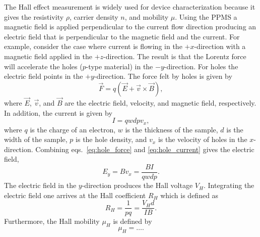 \noindent The Hall effect measurement is widely used for device characterization because it gives the resistivity $\rho$, carrier density $n$, and mobility $\mu$. Using the \acs{PPMS} a magnetic field is applied perpendicular to the current flow direction producing an electric field that is perpendicular to the magnetic field and the current. For example, consider the case where current is flowing in the $+x$-direction with a magnetic field applied in the $+z$-direction. The result is that the Lorentz force will accelerate the holes ($p$-type material) in the $-y$-direction. For holes the electric field points in the $+y$-direction. The force felt by holes is given by
\begin{equation}\label{eq:hole_force}
	\vec{F} = q\left(\vec{E} + \vec{v}\times \vec{B}\right),
\end{equation}
where $\vec{E}$, $\vec{v}$, and $\vec{B}$ are the electric field, velocity, and magnetic field, respectively. In addition, the current is given by
\begin{equation}\label{eq:hole_current}
	I = q w d p v_x,
\end{equation}
where $q$ is the charge of an electron, $w$ is the thickness of the sample, $d$ is the width of the sample, $p$ is the hole density, and $v_x$ is the velocity of holes in the $x$-direction. Combining eqs.~\ref{eq:hole_force} and \ref{eq:hole_current} gives the electric field,
\begin{equation}\label{eq:efield}
	E_y = B v_x = \frac{B I}{q w d p}.
\end{equation}
The electric field in the $y$-direction produces the Hall voltage $V_H$. Integrating the electric field one arrives at the Hall coefficient $R_H$ which is defined as 
\begin{equation}\label{eq:hall_coeff}
	R_H = \frac{1}{p q} = \frac{V_H d}{I B}.
\end{equation}
Furthermore, the Hall mobility $\mu_H$ is defined by 
\begin{equation}\label{eq:mu_hall}
	\mu_H = \ldots.
\end{equation}
